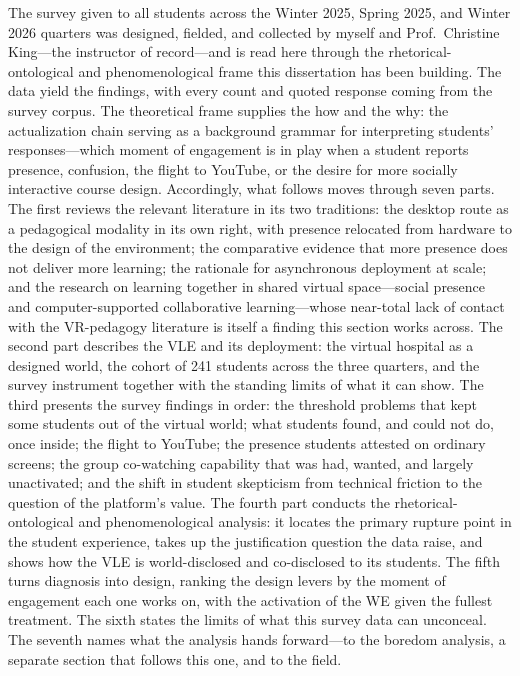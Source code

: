
The survey given to all students across the Winter 2025, Spring 2025, and
Winter 2026 quarters was designed, fielded, and collected by myself and
Prof.\ Christine King---the instructor of record---and is read here
through the rhetorical-ontological and phenomenological frame this dissertation
has been building. The data yield the findings, with every count and quoted
response coming from the survey corpus. The theoretical frame supplies the how
and the why: the actualization chain serving as a background grammar for
interpreting students' responses---which moment of engagement is in play when a
student reports presence, confusion, the flight to YouTube, or the desire for
more socially interactive course design. Accordingly, what follows moves through
seven parts. The first reviews the relevant literature in its two traditions:
the desktop route as a pedagogical modality in its own right, with presence
relocated from hardware to the design of the environment; the comparative
evidence that more presence does not deliver more learning; the rationale for
asynchronous deployment at scale; and the research on learning together in
shared virtual space---social presence and computer-supported collaborative
learning---whose near-total lack of contact with the VR-pedagogy literature is
itself a finding this section works across. The second part describes the VLE
and its deployment: the virtual hospital as a designed world, the cohort of 241
students across the three quarters, and the survey instrument together with the
standing limits of what it can show. The third presents the survey findings in
order: the threshold problems that kept some students out of the virtual world;
what students found, and could not do, once inside; the flight to YouTube; the
presence students attested on ordinary screens; the group co-watching capability
that was had, wanted, and largely unactivated; and the shift in student
skepticism from technical friction to the question of the platform's value. The
fourth part conducts the rhetorical-ontological and phenomenological analysis:
it locates the primary rupture point in the student experience, takes up the
justification question the data raise, and shows how the VLE is world-disclosed
and co-disclosed to its students. The fifth turns diagnosis into design, ranking
the design levers by the moment of engagement each one works on, with the
activation of the WE given the fullest treatment. The sixth states the limits of
what this survey data can unconceal. The seventh names what the analysis hands
forward---to the boredom analysis, a separate section that follows this one, and
to the field.

